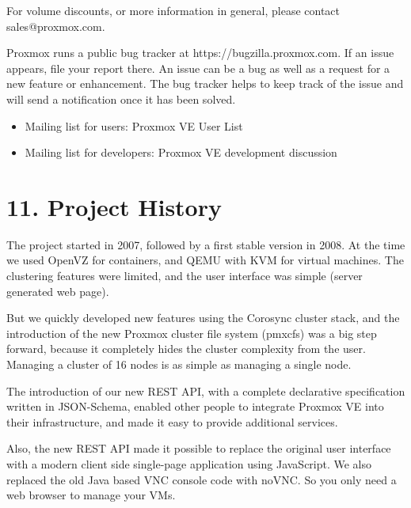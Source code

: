 For volume discounts, or more information in general, please contact sales@proxmox.com.

Proxmox runs a public bug tracker at https://bugzilla.proxmox.com. If an issue appears, file your report there. An issue can be a bug as well as a request for a new feature or enhancement. The bug tracker helps to keep track of the issue and will send a notification once it has been solved.

\begin{itemize}[leftmargin=2cm]

	\item Mailing list for users: Proxmox VE User List

\end{itemize}

\begin{itemize}[leftmargin=2cm]

	\item Mailing list for developers: Proxmox VE development discussion

\end{itemize}


\section{11. Project History}

The project started in 2007, followed by a first stable version in 2008. At the time we used OpenVZ for containers, and QEMU with KVM for virtual machines. The clustering features were limited, and the user interface was simple (server generated web page).

But we quickly developed new features using the Corosync cluster stack, and the introduction of the new Proxmox cluster file system (pmxcfs) was a big step forward, because it completely hides the cluster complexity from the user. Managing a cluster of 16 nodes is as simple as managing a single node.

The introduction of our new REST API, with a complete declarative specification written in JSON-Schema, enabled other people to integrate Proxmox VE into their infrastructure, and made it easy to provide additional services.

Also, the new REST API made it possible to replace the original user interface with a modern client side single-page application using JavaScript. We also replaced the old Java based VNC console code with noVNC. So you only need a web browser to manage your VMs.

